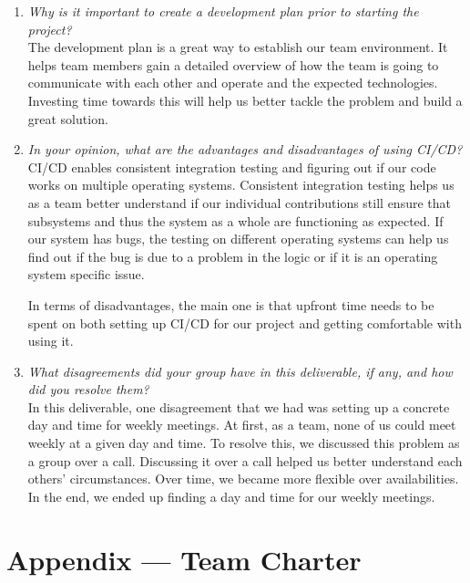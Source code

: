 \documentclass{article}
\begin{document}
\begin{enumerate}
    \item \textit{Why is it important to create a development plan prior to starting the
    project?}\\
    The development plan is a great way to establish our team environment. It helps team members gain a detailed overview of 
    how the team is going to communicate with each other and operate and the expected technologies. Investing time towards this
    will help us better tackle the problem and build a great solution. 

    \item \textit{In your opinion, what are the advantages and disadvantages of using
    CI/CD?}\\
    CI/CD enables consistent integration testing and figuring out if our code works on multiple operating systems. Consistent
    integration testing helps us as a team better understand if our individual contributions still ensure that subsystems and thus the system 
    as a whole are functioning as expected. If our system has bugs, the testing on different operating systems can help us find out if
    the bug is due to a problem in the logic or if it is an operating system specific issue.

    In terms of disadvantages, the main one is that upfront time needs to be spent on both setting up CI/CD for our project and getting comfortable
    with using it.

    \item \textit{What disagreements did your group have in this deliverable, if any,
    and how did you resolve them?}\\
    In this deliverable, one disagreement that we had was setting up a concrete day and time for weekly meetings. At first, as a team,
    none of us could meet weekly at a given day and time. To resolve this, we discussed this problem as a group over a call. Discussing it
    over a call helped us better understand each others' circumstances. Over time, we became more flexible over availabilities. In the end,
    we ended up finding a day and time for our weekly meetings.

\end{enumerate}

\newpage{}

\section*{Appendix --- Team Charter}
\end{document}

